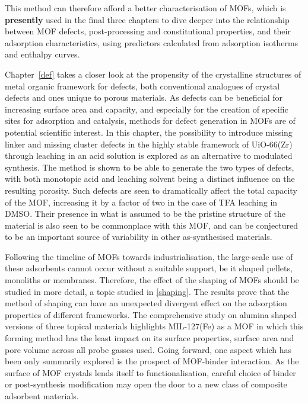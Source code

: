This method can therefore afford a better characterisation of \glspl{MOF},
which is \textbf{presently} used in the final three chapters 
to dive deeper into the relationship between \gls{MOF} defects,
post-processing and constitutional properties,
and their adsorption characteristics, using predictors calculated from
adsorption isotherms and enthalpy curves.

Chapter~\ref{def} takes a closer look at the propensity of the 
crystalline structures of metal organic framework for defects,
both conventional analogues of crystal defects and ones unique
to porous materials. As defects can be beneficial for increasing 
surface area and capacity, and especially for the creation
of specific sites for adsorption and catalysis, methods for 
defect generation in \glspl{MOF} are of potential scientific interest.
In this chapter, the possibility to introduce missing linker and 
missing cluster defects in the highly stable framework of UiO-66(Zr)
through leaching in an acid solution is explored as an alternative 
to modulated synthesis. The method is shown to be able to generate
the two types of defects, with both monotopic acid and leaching 
solvent being a distinct influence on the resulting porosity.
Such defects are seen to dramatically affect the total capacity 
of the \gls{MOF}, increasing it by a factor of two in the case of \gls{TFA}
leaching in \gls{DMSO}. Their presence in what is assumed
to be the pristine structure of the material is also seen 
to be commonplace with this \gls{MOF}, and can be conjectured to be an
important source of variability in other as-synthesised materials.

Following the timeline of \glspl{MOF} towards industrialisation, the 
large-scale use of these adsorbents cannot occur without a suitable
support, be it shaped pellets, monoliths or membranes. Therefore,
the effect of the shaping of \glspl{MOF} should be studied in more detail,
a topic studied in \autoref{shaping}. The results prove that the method
of shaping can have an unexpected divergent effect on the adsorption 
properties of different frameworks. The comprehensive study on 
alumina shaped versions of three topical materials highlights
MIL-127(Fe) as a \gls{MOF} in which this forming method has the least impact on
its surface properties, surface area and pore volume across all 
probe gasses used. Going forward, one aspect which has been only 
summarily explored is the prospect of \gls{MOF}-binder interaction. 
As the surface of \gls{MOF} crystals lends itself to functionalisation, 
careful choice of binder or post-synthesis modification may open the
door to a new class of composite adsorbent materials.

